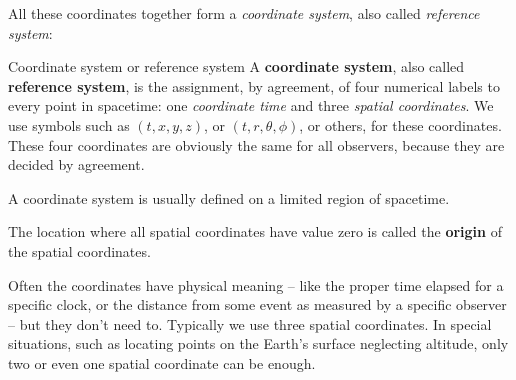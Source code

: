 \documentclass[a4paper,12pt,%
onecolumn,oneside,%
british%
]{memoir}
\renewcommand*{\|}[1][]{\nonscript\:#1\vert\nonscript\:\mathopen{}}
\begin{document}
All these coordinates together form a \emph{coordinate system}, also called \emph{reference system}:
\begin{definition}{Coordinate system or reference system}\label{def:coordinates}
  A \textbf{coordinate system}, also called \textbf{reference system}, is the assignment, by agreement, of four numerical labels to every point in spacetime: one \emph{coordinate time} and three \emph{spatial coordinates}. We use symbols such as $(t,x,y,z)$, or $(t, r, \theta,\phi)$, or others, for these coordinates. These four coordinates are obviously the same for all observers, because they are decided by agreement.

  \smallskip
  
   A coordinate system is usually defined on a limited region of spacetime.

  \smallskip

  The location where all spatial coordinates have value zero is called the \textbf{origin} of the spatial coordinates.
\end{definition}

  Often the coordinates have physical meaning -- like the proper time elapsed for a specific clock, or the distance from some event as measured by a specific observer -- but they don't need to. Typically we use three spatial coordinates. In special situations, such as locating points on the Earth's surface neglecting altitude, only two or even one spatial coordinate can be enough.
\end{document}
